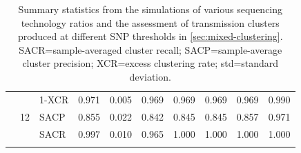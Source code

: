 \begin{longtable}[c]{@{}llllllllll@{}}
                        & \multirow{3}{*}{12} & 1-XCR  & 0.971 & 0.005 & 0.969 & 0.969 & 0.969 & 0.969 & 0.990 \\
                        &                     & SACP   & 0.855 & 0.022 & 0.842 & 0.845 & 0.845 & 0.857 & 0.971 \\
                        &                     & SACR   & 0.997 & 0.010 & 0.965 & 1.000 & 1.000 & 1.000 & 1.000 \\* \cmidrule(l){2-10} 
\caption{Summary statistics from the simulations of various sequencing technology ratios and the assessment of transmission clusters produced at different SNP thresholds in \autoref{sec:mixed-clustering}. SACR=sample-averaged cluster recall; SACP=sample-average cluster precision; XCR=excess clustering rate; std=standard deviation.}
\label{tab:mixed-sims-full}\\
\end{longtable}